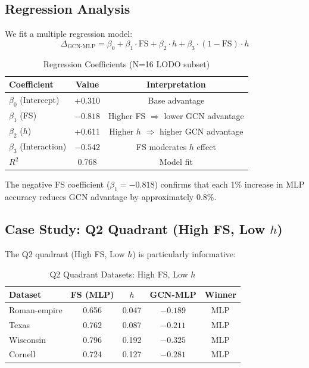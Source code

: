 \subsection{Regression Analysis}

We fit a multiple regression model:
\begin{equation}
    \Delta_{\text{GCN-MLP}} = \beta_0 + \beta_1 \cdot \text{FS} + \beta_2 \cdot h + \beta_3 \cdot (1-\text{FS}) \cdot h
\end{equation}

\begin{table}[t]
\centering
\caption{Regression Coefficients (N=16 LODO subset)}
\label{tab:regression}
\begin{tabular}{@{}lcc@{}}
\toprule
Coefficient & Value & Interpretation \\
\midrule
$\beta_0$ (Intercept) & +0.310 & Base advantage \\
$\beta_1$ (FS) & $-0.818$ & Higher FS $\Rightarrow$ lower GCN advantage \\
$\beta_2$ ($h$) & +0.611 & Higher $h$ $\Rightarrow$ higher GCN advantage \\
$\beta_3$ (Interaction) & $-0.542$ & FS moderates $h$ effect \\
\midrule
$R^2$ & 0.768 & Model fit \\
\bottomrule
\end{tabular}
\end{table}

The negative FS coefficient ($\beta_1 = -0.818$) confirms that each 1\% increase in MLP accuracy reduces GCN advantage by approximately 0.8\%.

\subsection{Case Study: Q2 Quadrant (High FS, Low $h$)}

The Q2 quadrant (High FS, Low $h$) is particularly informative:

\begin{table}[t]
\centering
\caption{Q2 Quadrant Datasets: High FS, Low $h$}
\label{tab:q2}
\begin{tabular}{@{}lcccc@{}}
\toprule
Dataset & FS (MLP) & $h$ & GCN-MLP & Winner \\
\midrule
Roman-empire & 0.656 & 0.047 & $-0.189$ & MLP \\
Texas & 0.762 & 0.087 & $-0.211$ & MLP \\
Wisconsin & 0.796 & 0.192 & $-0.325$ & MLP \\
Cornell & 0.724 & 0.127 & $-0.281$ & MLP \\
\bottomrule
\end{tabular}
\end{table}

